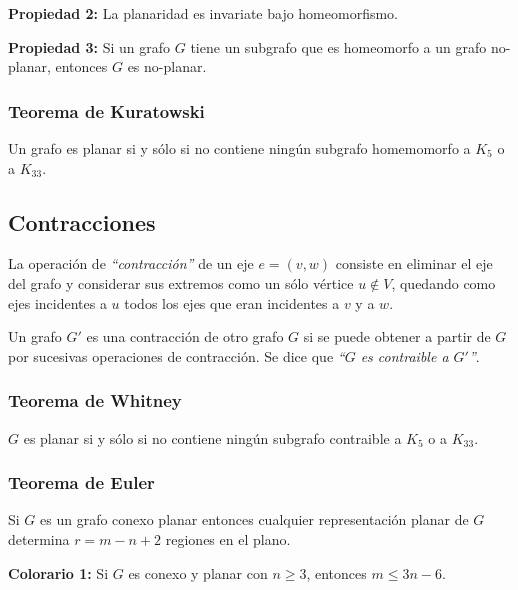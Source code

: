 \begin{badidea}
\textbf{Propiedad 2:} La planaridad es invariate bajo homeomorfismo.
\end{badidea}

\begin{badidea}
\textbf{Propiedad 3:} Si un grafo $G$ tiene un subgrafo que es homeomorfo a un grafo no-planar, entonces $G$ es no-planar.
\end{badidea}

\subsubsection{Teorema de Kuratowski}

Un grafo es planar si y s\'olo si no contiene ning\'un subgrafo homemomorfo a $K_5$ o a $K_{33}$.

\subsection{Contracciones}

La operaci\'on de \emph{``contracci\'on''} de un eje $e = (v, w)$ consiste en eliminar el eje del grafo y considerar sus extremos como un s\'olo v\'ertice $u \not\in V$, quedando como ejes incidentes a $u$ todos los ejes que eran incidentes a $v$ y a $w$.

Un grafo $G'$ es una contracci\'on de otro grafo $G$ si se puede obtener a partir de $G$ por sucesivas operaciones de contracci\'on. Se dice que \emph{``$G$ es contraible a $G'$''}.

\newpage
\subsubsection{Teorema de Whitney}

$G$ es planar si y s\'olo si no contiene ning\'un subgrafo contraible a $K_{5}$ o a $K_{33}$.

\subsubsection{Teorema de Euler}

Si $G$ es un grafo conexo planar entonces cualquier representaci\'on planar de $G$ determina $r = m - n + 2$ regiones en el plano.

\begin{badidea}
\textbf{Colorario 1:} Si $G$ es conexo y planar con $n \geq 3$, entonces $m \leq 3n - 6$.
\end{badidea}

